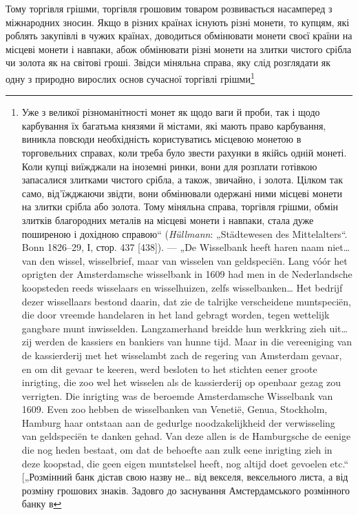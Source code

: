 Тому торгівля грішми, торгівля грошовим товаром розвивається
насамперед з міжнародних зносин. Якщо в різних країнах
існують різні монети, то купцям, які роблять закупівлі в чужих
країнах, доводиться обмінювати монети своєї країни на місцеві
монети і навпаки, абож обмінювати різні монети на злитки чистого
срібла чи золота як на світові гроші. Звідси міняльна справа, яку
слід розглядати як одну з природно вирослих основ сучасної торгівлі
грішми\footnote{
Уже з великої різноманітності монет як щодо ваги й проби, так і щодо
карбування їх багатьма князями й містами, які мають право карбування, виникла
повсюди необхідність користуватись місцевою монетою в торговельних справах,
коли треба було звести рахунки в якійсь одній монеті. Коли купці
виїжджали на іноземні ринки, вони для розплати готівкою запасалися злитками
чистого срібла, а також, звичайно, і золота. Цілком так само, від’їжджаючи
звідти, вони обмінювали одержані ними місцеві монети на злитки
срібла або золота. Тому міняльна справа, торгівля грішми, обмін злитків благородних
металів на місцеві монети і навпаки, стала дуже поширеною і дохідною
справою“ (\emph{Hüllmann}: „Städtewesen des Mittelalters“. Bonn 1826--29,
І, стор. 437 [438]). — „De Wisselbank heeft haren naam niet\dots{} van den wissel, wisselbrief,
maar van wisselen van geldspeciën. Lang vóór het oprigten der Amsterdamsche
wisselbank in 1609 had men in de Nederlandsche koopsteden reeds wisselaars
en wisselhuizen, zelfs wisselbanken\dots{} Het bedrijf dezer wissellaars bestond
daarin, dat zie de talrijke verscheidene muntspeciën, die door vreemde handelaren
in het land gebragt worden, tegen wettelijk gangbare munt inwisselden. Langzamerhand
breidde hun werkkring zieh uit\dots{} zij werden de kassiers en bankiers van
hunne tijd. Maar in die vereeniging van de kassierderij met het wisselambt zach
de regering van Amsterdam gevaar, en om dit gevaar te keeren, werd besloten to
het stichten eener groote inrigting, die zoo wel het wisselen als de kassierderij op
openbaar gezag zou verrigten. Die inrigting was de beroemde Amsterdamsche Wisselbank
van 1609. Even zoo hebben de wisselbanken van Venetië, Genua, Stockholm,
Hamburg haar ontstaan aan de gedurlge noodzakelijkheid der verwisseling van
geldspeciën te danken gehad. Van deze allen is de Hamburgsche de eenige die
nog heden bestaat, om dat de behoefte aan zulk eene inrigting zieh in deze
koopstad, die geen eigen muntstelsel heeft, nog altijd doet gevoelen etc.“ [„Розмінний
банк дістав свою назву не\dots{} від векселя, вексельного листа, а від розміну
грошових знаків. Задовго до заснування Амстердамського розмінного банку в
}
